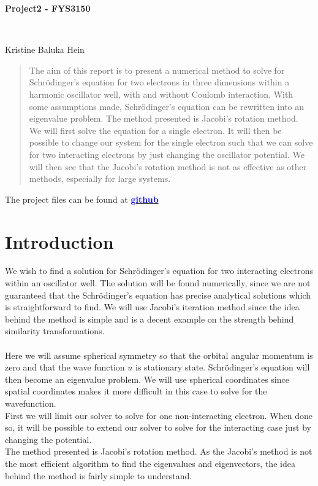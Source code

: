 \documentclass[12pt]{article}
\begin{document}
	 \centerline{\Large \textbf{Project2 - FYS3150}} \hfill \\
	 \centerline{\normalsize Kristine Baluka Hein}
	 \begin{abstract}
	 	The aim of this report is to present a numerical method to solve for Schrödinger's equation for two electrons in three dimensions within a harmonic oscillator well, with and without Coulomb interaction. With some assumptions made, Schrödinger's equation can be rewritten into an eigenvalue problem. The method presented is Jacobi's rotation method. \\ We will first solve the equation for a single electron. It will then be possible to change our system for the single electron such that we can solve for two interacting electrons by just changing the oscillator potential. We will then see that the Jacobi's rotation method is not as effective as other methods, especially for large systems. 
	 \end{abstract}
	 The project files can be found at \href{https://github.com/krisbhei/FYS3150/tree/master/Project2}{\textcolor{blue}{\textbf{github}}}
	 \section{Introduction} 

	 We wish to find a solution for Schrödinger's equation for two interacting electrons within an oscillator well. 
	 The solution will be found numerically, since we are not guaranteed that the Schrödinger's equation has precise analytical solutions which is straightforward to find. We will use Jacobi's iteration method since the idea behind the method is simple and is a decent example on the strength behind similarity transformations.\\   \\
	 Here we will assume spherical symmetry so that the orbital angular momentum is zero and that the wave function $u$ is stationary state. Schrödinger's equation will then become an eigenvalue problem. We will use spherical coordinates since spatial coordinates makes it more difficult in this case to solve for the wavefunction. \\
	 First we will limit our solver to solve for one non-interacting electron. When done so, it will be possible to extend our solver to solve for the interacting case just by changing the potential. \\ 
	 The method presented is Jacobi's rotation method. As the Jacobi's method is not the most efficient algorithm to find the eigenvalues and eigenvectors, the idea behind the method is fairly simple to understand. \\
\end{document}
